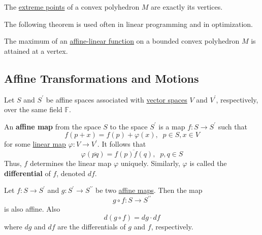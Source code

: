   \begin{theorem}
    \label{thm:extreme-points-of-a-polyhedron-are-its-vertices}
    The \hyperref[def:extreme-point]{extreme points} of a convex polyhedron $M$ are exactly its vertices. 
  \end{theorem}

  The following theorem is used often in linear programming and in optimization. 

  \begin{theorem}
    \label{thm:affine-linear-maxima-are-attained-at-a-vertex}
    The maximum of an \hyperref[def:affine-linear-function]{affine-linear function} on a bounded convex polyhedron $M$ is attained at a vertex. 
  \end{theorem}

\subsection{Affine Transformations and Motions}

  Let $S$ and $S^\prime$ be affine spaces associated with \hyperref[def:vector-space]{vector spaces} $V$ and $V^\prime$, respectively, over the same field $\mathbb{F}$. 

  \begin{definition}
    \label{def:affine-map}
    An \textbf{affine map} from the space $S$ to the space $S^\prime$ is a map $f: S \to S^\prime$ such that
    \begin{equation}
      f(p+x) = f(p) + \varphi(x), \;\; p \in S, x \in V
    \end{equation}
    for some \hyperref[thm:linear-map]{linear map} $\varphi: V \to V^\prime$. It follows that
    \begin{equation}
      \varphi(\overline{pq}) = \overline{f(p) f(q)}, \;\; p, q \in S
    \end{equation}
    Thus, $f$ determines the linear map $\varphi$ uniquely. Similarly, $\varphi$ is called the \textbf{differential} of $f$, denoted $df$. 
  \end{definition}

  \begin{theorem}
    \label{thm:composition-of-affine-maps}
    Let $f: S \to S^\prime$ and $g: S^\prime \to S^{\prime \prime}$ be two \hyperref[def:affine-map]{affine maps}. Then the map
    \begin{equation}
      g \circ f : S \to S^{\prime\prime}
    \end{equation}
    is also affine. Also
    \begin{equation}
      d(g \circ f) = dg \cdot df
    \end{equation}
    where $dg$ and $df$ are the differentials of $g$ and $f$, respectively. 
  \end{theorem}

